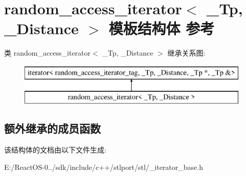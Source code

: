 \hypertarget{structrandom__access__iterator}{}\section{random\+\_\+access\+\_\+iterator$<$ \+\_\+\+Tp, \+\_\+\+Distance $>$ 模板结构体 参考}
\label{structrandom__access__iterator}
类 random\+\_\+access\+\_\+iterator$<$ \+\_\+\+Tp, \+\_\+\+Distance $>$ 继承关系图\+:\begin{figure}[H]
\begin{center}
\leavevmode
\includegraphics[height=2.000000cm]{structrandom__access__iterator}
\end{center}
\end{figure}
\subsection*{额外继承的成员函数}


该结构体的文档由以下文件生成\+:\begin{DoxyCompactItemize}
\item 
E\+:/\+React\+O\+S-\/0../sdk/include/c++/stlport/stl/\+\_\+iterator\+\_\+base.\+h\end{DoxyCompactItemize}
